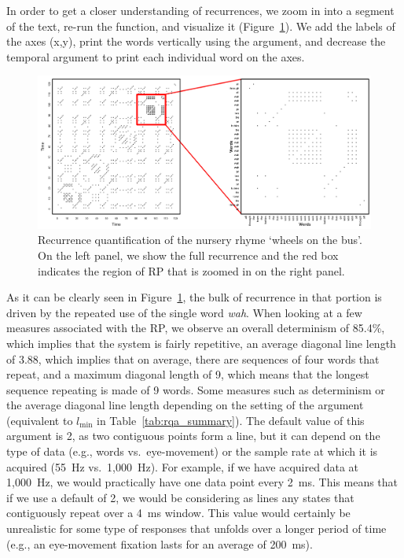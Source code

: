 In order to get a closer understanding of recurrences, we zoom in into a segment of the text, re-run the  function, and visualize it (Figure~\ref{fig_rqa_text}). We add the labels of the axes (x,y), print the words vertically using the  argument, and decrease the temporal  argument to print each individual word on the axes.


\begin{figure}
\includegraphics[width=\columnwidth]{Figure4_complete.png}
\caption{\label{fig_rqa_text} Recurrence quantification of the nursery rhyme `wheels on the bus'. On the left panel, we show the full recurrence and the red box indicates the region of RP that is zoomed in on the right panel.}
\end{figure}

 As it can be clearly seen in Figure~\ref{fig_rqa_text}, the bulk of recurrence in that portion is driven by the repeated use of the single word \textit{wah}. When looking at a few measures associated with the RP, we observe an overall determinism of 85.4\%, which implies that the system is fairly repetitive, an average diagonal line length of 3.88, which implies that on average, there are sequences of four words that repeat, and a maximum diagonal length of 9, which means that the longest sequence repeating is made of 9 words. Some measures such as determinism or the average diagonal line length depending on the setting of the argument  (equivalent to $l_$ in Table~\ref{tab:rqa_summary}). The default value of this argument is 2, as two contiguous points form a line, but it can depend on the type of data (e.g., words vs.\ eye-movement) or the sample rate at which it is acquired (55~Hz vs.\ 1,000~Hz). For example, if we have acquired data at 1,000~Hz, we would practically have one data point every 2~ms. This means that if we use a default  of 2, we would be considering as lines any states that contiguously repeat over a 4~ms window. This value would certainly be unrealistic for some type of responses that unfolds over a longer period of time (e.g., an eye-movement fixation lasts for an average of 200~ms). 

